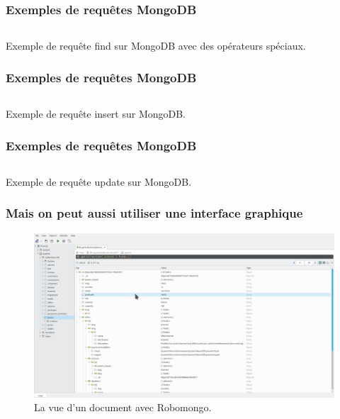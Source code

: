 	\begin{frame}
		\frametitle{Exemples de requêtes MongoDB}

		\begin{listing}[H]
			\inputminted{javascript}{code/requeteMongoFindOperator.js}
			\caption{Exemple de requête find sur MongoDB avec des opérateurs spéciaux.}
			\label{findOperatorMongoDB}
		\end{listing}
	\end{frame}

	\begin{frame}
		\frametitle{Exemples de requêtes MongoDB}

		\begin{listing}[H]
			\inputminted{javascript}{code/requeteMongoInsert.js}
			\caption{Exemple de requête insert sur MongoDB.}
			\label{insertMongoDB}
		\end{listing}
	\end{frame}

	\begin{frame}
		\frametitle{Exemples de requêtes MongoDB}

		\begin{listing}[H]
			\inputminted{javascript}{code/requeteMongoUpdate.js}
			\caption{Exemple de requête update sur MongoDB.}
			\label{updateMongoDB}
		\end{listing}
	\end{frame}

	\begin{frame}
		\frametitle{Mais on peut aussi utiliser une interface graphique}

        \begin{figure}[htb]
            \includegraphics[width=1\textwidth]{images/robomongo.png}
            \caption{La vue d'un document avec Robomongo.}
        \end{figure}
	\end{frame}

